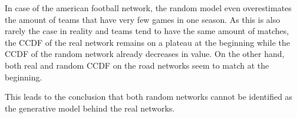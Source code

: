 In case of the american football network, the random model even overestimates the amount of teams that have very few games in one season. As this is also rarely the case in reality and teams tend to have the same amount of matches, the CCDF of the real network remains on a plateau at the beginning while the CCDF of the random network already decreases in value. On the other hand, both real and random CCDF on the road networks seem to match at the beginning. 

This leads to the conclusion that both random networks cannot be identified as the generative model behind the real networks.